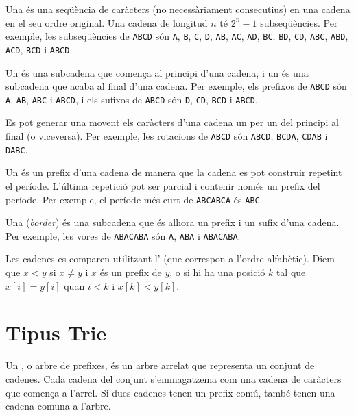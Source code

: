 
Una  és una seqüència de caràcters (no
necessàriament consecutius) en una cadena en el seu ordre
original. Una cadena de longitud $n$ té $2^n-1$ subseqüències. Per
exemple, les subseqüències de \texttt{ABCD} són \texttt{A},
\texttt{B}, \texttt{C}, \texttt{D}, \texttt{AB}, \texttt{AC}, \texttt
       {AD}, \texttt{BC}, \texttt{BD}, \texttt{CD}, \texttt{ABC},
       \texttt{ABD}, \texttt{ACD}, \texttt{BCD} i \texttt{ABCD}.

 

Un  és una subcadena que comença al principi d'una cadena,
i un  és una subcadena que acaba al final d'una
cadena. Per exemple, els prefixos de \texttt{ABCD} són \texttt{A},
\texttt{AB}, \texttt{ABC} i \texttt{ABCD}, i els sufixos de
\texttt{ABCD} són \texttt{D}, \texttt{CD}, \texttt{BCD} i
\texttt{ABCD}.


Es pot generar una  movent els caràcters d'una cadena un
per un del principi al final (o viceversa). Per exemple, les rotacions
de \texttt{ABCD} són \texttt{ABCD}, \texttt{BCDA}, \texttt{CDAB} i
\texttt{DABC}.


Un  és un prefix d'una cadena de manera que la cadena es
pot construir repetint el període. L'última repetició pot ser parcial i
contenir només un prefix del període. Per exemple, el període més curt de
\texttt{ABCABCA} és \texttt{ABC}.


Una  (\emph{border}) és una subcadena que és alhora un
prefix i un sufix d'una cadena. Per exemple, les vores de
\texttt{ABACABA} són \texttt{A}, \texttt{ABA} i \texttt{ABACABA}.


Les cadenes es comparen utilitzant l' (que
correspon a l'ordre alfabètic). Diem que $x<y$ si $x \neq y$ i
$x$ és un prefix de $y$, o si hi ha una posició $k$ tal que $x[i]=y[i]$
quan $i<k$ i $x[k]<y[k]$.

\section{Tipus Trie}


Un , o arbre de prefixes, és un arbre arrelat que representa
un conjunt de cadenes. Cada cadena del conjunt s'emmagatzema com una
cadena de caràcters que comença a l'arrel. Si dues cadenes tenen un
prefix comú, també tenen una cadena comuna a l'arbre.

